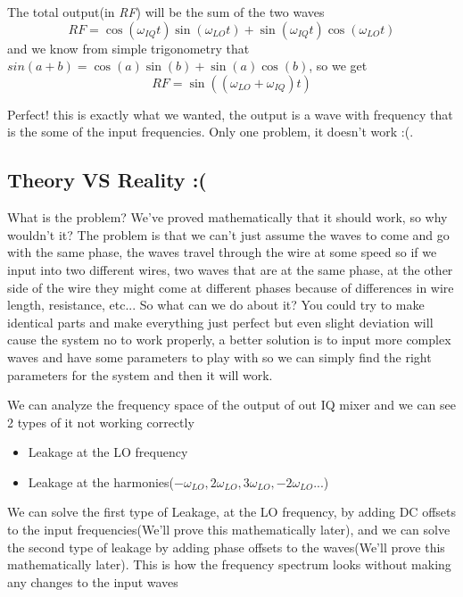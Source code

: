 \documentclass[english, a4paper, 12pt, twoside]{article}
\numberwithin{equation}{section} %
\begin{document}
The total output(in \textit{RF}) will be the sum of the two waves
$$RF = \cos(\omega_{IQ}t)\sin(\omega_{LO}t) + \sin(\omega_{IQ}t)\cos(\omega_{LO}t)$$
and we know from simple trigonometry that $sin(a + b) = \cos(a)\sin(b) + \sin(a)\cos(b)$, so we get
\begin{equation}
    \boxed{RF = \sin((\omega_{LO} + \omega_{IQ})t)}
\end{equation}

Perfect! this is exactly what we wanted, the output is a wave with frequency that is the some of the input frequencies. Only one problem, it doesn't work :(.

\subsection{Theory VS Reality :(} %
What is the problem? We've proved mathematically that it should work, so why wouldn't it? The problem is that we can't just assume the waves to come and go with the same phase, the waves travel through the wire at some speed so if we input into two different wires, two waves that are at the same phase, at the other side of the wire they might come at different phases because of differences in wire length, resistance, etc... So what can we do about it? You could try to make identical parts and make everything just perfect but even slight deviation will cause the system no to work properly, a better solution is to input more complex waves and have some parameters to play with so we can simply find the right parameters for the system and then it will work.%

We can analyze the frequency space of the output of out IQ mixer and we can see 2 types of it not working correctly
\begin{itemize}
  \item Leakage at the LO frequency
  \item Leakage at the harmonies($-\omega_{LO}, 2\omega_{LO}, 3\omega_{LO}, -2\omega_{LO}$...)
\end{itemize}
We can solve the first type of Leakage, at the LO frequency, by adding DC offsets to the input frequencies(We'll prove this mathematically later), and we can solve the second type of leakage by adding phase offsets to the waves(We'll prove this mathematically later).
This is how the frequency spectrum looks without making any changes to the input waves
\end{document}
